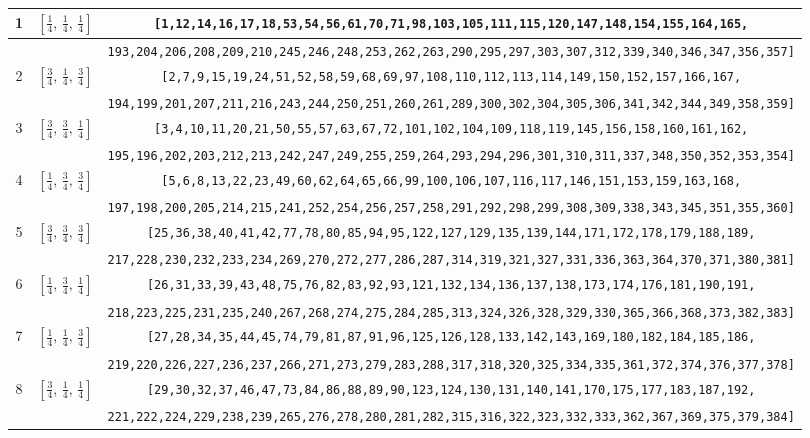 \documentclass[fleqn,8pt]{jsarticle}
\begin{document}
\begin{longtable}{ccc}
1 & $\left[ \frac{1}{4},\, \frac{1}{4},\, \frac{1}{4} \right]$ & {\tt [1,12,14,16,17,18,53,54,56,61,70,71,98,103,105,111,115,120,147,148,154,155,164,165,} \\ \hline
 &  & {\tt 193,204,206,208,209,210,245,246,248,253,262,263,290,295,297,303,307,312,339,340,346,347,356,357]} \\ \hline
2 & $\left[ \frac{3}{4},\, \frac{1}{4},\, \frac{3}{4} \right]$ & {\tt [2,7,9,15,19,24,51,52,58,59,68,69,97,108,110,112,113,114,149,150,152,157,166,167,} \\ \hline
 &  & {\tt 194,199,201,207,211,216,243,244,250,251,260,261,289,300,302,304,305,306,341,342,344,349,358,359]} \\ \hline
3 & $\left[ \frac{3}{4},\, \frac{3}{4},\, \frac{1}{4} \right]$ & {\tt [3,4,10,11,20,21,50,55,57,63,67,72,101,102,104,109,118,119,145,156,158,160,161,162,} \\ \hline
 &  & {\tt 195,196,202,203,212,213,242,247,249,255,259,264,293,294,296,301,310,311,337,348,350,352,353,354]} \\ \hline
4 & $\left[ \frac{1}{4},\, \frac{3}{4},\, \frac{3}{4} \right]$ & {\tt [5,6,8,13,22,23,49,60,62,64,65,66,99,100,106,107,116,117,146,151,153,159,163,168,} \\ \hline
 &  & {\tt 197,198,200,205,214,215,241,252,254,256,257,258,291,292,298,299,308,309,338,343,345,351,355,360]} \\ \hline
5 & $\left[ \frac{3}{4},\, \frac{3}{4},\, \frac{3}{4} \right]$ & {\tt [25,36,38,40,41,42,77,78,80,85,94,95,122,127,129,135,139,144,171,172,178,179,188,189,} \\ \hline
 &  & {\tt 217,228,230,232,233,234,269,270,272,277,286,287,314,319,321,327,331,336,363,364,370,371,380,381]} \\ \hline
6 & $\left[ \frac{1}{4},\, \frac{3}{4},\, \frac{1}{4} \right]$ & {\tt [26,31,33,39,43,48,75,76,82,83,92,93,121,132,134,136,137,138,173,174,176,181,190,191,} \\ \hline
 &  & {\tt 218,223,225,231,235,240,267,268,274,275,284,285,313,324,326,328,329,330,365,366,368,373,382,383]} \\ \hline
7 & $\left[ \frac{1}{4},\, \frac{1}{4},\, \frac{3}{4} \right]$ & {\tt [27,28,34,35,44,45,74,79,81,87,91,96,125,126,128,133,142,143,169,180,182,184,185,186,} \\ \hline
 &  & {\tt 219,220,226,227,236,237,266,271,273,279,283,288,317,318,320,325,334,335,361,372,374,376,377,378]} \\ \hline
8 & $\left[ \frac{3}{4},\, \frac{1}{4},\, \frac{1}{4} \right]$ & {\tt [29,30,32,37,46,47,73,84,86,88,89,90,123,124,130,131,140,141,170,175,177,183,187,192,} \\ \hline
 &  & {\tt 221,222,224,229,238,239,265,276,278,280,281,282,315,316,322,323,332,333,362,367,369,375,379,384]} \\
\end{longtable}
\end{document}
